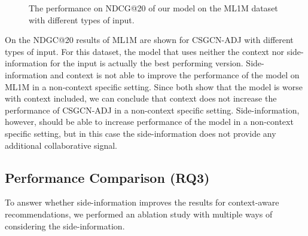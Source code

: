 \begin{figure}
    \caption{The performance on NDCG@20 of our model on the ML1M dataset with different types of input.}
    \label{fig:ablation_study_2}
\end{figure}
On  the NDGC@20 results of ML1M are shown for CSGCN-ADJ with different types of input. 
For this dataset, the model that uses neither the context nor side-information for the input is actually the best performing version.
Side-information and context is not able to improve the performance of the model on ML1M in a non-context specific setting.
Since both  show that the model is worse with context included, we can conclude that context does not increase the performance of CSGCN-ADJ in a non-context specific setting.
Side-information, however, should be able to increase performance of the model in a non-context specific setting, but in this case the side-information does not provide any additional collaborative signal.

\subsection{Performance Comparison (RQ3)}
To answer whether side-information improves the results for context-aware recommendations, we performed an ablation study with multiple ways of considering the side-information.
